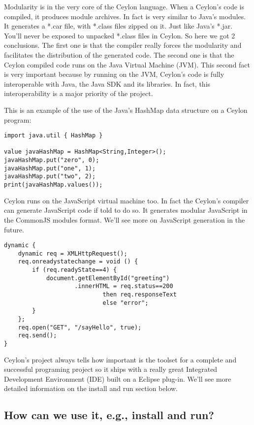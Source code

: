 \documentclass{abnt}
\begin{document}
Modularity is in the very core of the Ceylon language. When a Ceylon's code is
compiled, it produces module archives. In fact is very similar to Java's
modules. It generates a *.car file, with *.class files zipped on it. Just
like Java's *.jar. You'll never be exposed to unpacked *.class files in
Ceylon. So here we got 2 conclusions. The first one is that the compiler
really forces the modularity and facilitates the distribution of the generated
code. The second one is that the Ceylon compiled code runs on the Java Virtual
Machine (JVM). This second fact is very important because by running on the JVM,
Ceylon's code is fully interoperable with Java, the Java SDK and its libraries.
In fact, this interoperability is a major priority of the project.

This is an example of the use of the Java's HashMap data structure on a Ceylon
program:

\begin{lstlisting}[label=cujhm,caption=Ceylon using Java HashMap]
import java.util { HashMap }

value javaHashMap = HashMap<String,Integer>();
javaHashMap.put("zero", 0);
javaHashMap.put("one", 1);
javaHashMap.put("two", 2);
print(javaHashMap.values());
\end{lstlisting}

Ceylon runs on the JavaScript virtual machine too. In fact the Ceylon's compiler
can generate JavaScript code if told to do so. It generates modular JavaScript
in the CommonJS modules format. We'll see more on JavaScript generation in the
future.

\begin{lstlisting}[label=cjs,caption=Ceylon JavaScript]
dynamic {
    dynamic req = XMLHttpRequest();
    req.onreadystatechange = void () {
        if (req.readyState==4) {
            document.getElementById("greeting")
                    .innerHTML = req.status==200
                            then req.responseText
                            else "error";
        }
    };
    req.open("GET", "/sayHello", true);
    req.send();
}
\end{lstlisting}

Ceylon's project always tells how important is the toolset for a complete and
successful programing project so it ships with a really great Integrated
Development Environment (IDE) built on a Eclipse plug-in. We'll see more
detailed information on the {install and run} section below.

\subsection{How can we use it, e.g., install and run?}
\end{document}
